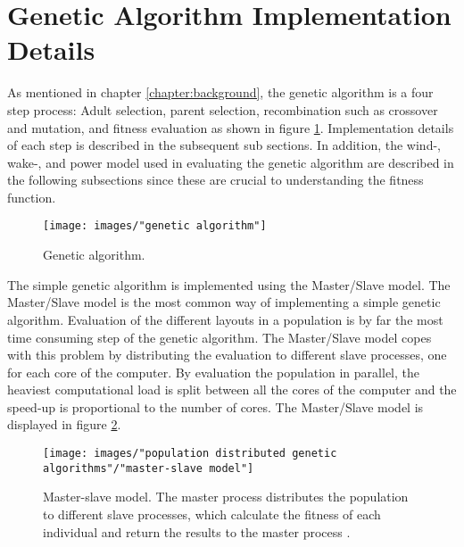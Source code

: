 \section{Genetic Algorithm Implementation Details}\label{section:genetic algorithm}
As mentioned in chapter \ref{chapter:background}, the genetic algorithm is a four step process: Adult selection, parent selection, recombination such as crossover and mutation, and fitness evaluation as shown in figure \ref{figure:genetic algorithm steps}. Implementation details of each step is described in the subsequent sub sections. In addition, the wind-, wake-, and power model used in evaluating the genetic algorithm are described in the following subsections since these are crucial to understanding the fitness function. 


\begin{figure}[h!]
\begin{center}
\texttt{[image: images/"genetic algorithm"]}
\caption{Genetic algorithm.}
\label{figure:genetic algorithm steps}
\end{center}
\end{figure}


\noindent The simple genetic algorithm is implemented using the Master/Slave model. The Master/Slave model is the most common way of implementing a simple genetic algorithm. Evaluation of the different layouts in a population is by far the most time consuming step of the genetic algorithm. The Master/Slave model copes with this problem by distributing the evaluation to different slave processes, one for each core of the computer. By evaluation the population in parallel, the heaviest computational load is split between all the cores of the computer and the speed-up is proportional to the number of cores. The Master/Slave model is displayed in figure \ref{Master-Slave Model}.\\


\begin{figure}[h!]
\begin{center}
\texttt{[image: images/"population distributed genetic algorithms"/"master-slave model"]}
\caption{Master-slave model. The master process distributes the population to different slave processes, which calculate the fitness of each individual and return the results to the master process \citep{Gong}.}
\label{Master-Slave Model}
\end{center}
\end{figure}


